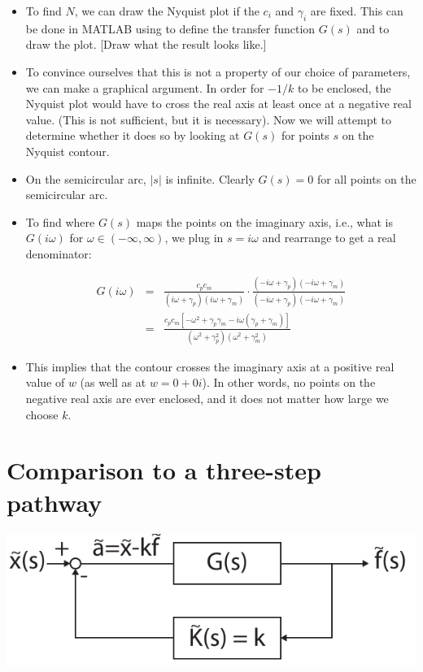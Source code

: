 \documentclass{article}
\begin{document}
\begin{itemize}
\item To find $N$, we can draw the Nyquist plot if the $c_i$ and $\gamma_i$ are fixed.  This can be done in MATLAB using  to define the transfer function $G(s)$ and  to draw the plot. [Draw what the result looks like.]

\item To convince ourselves that this is not a property of our choice of parameters, we can make a graphical argument. In order for $-1/k$ to be enclosed, the Nyquist plot would have to cross the real axis at least once at a negative real value. (This is not sufficient, but it is necessary). Now we will attempt to determine whether it does so by looking at $G(s)$ for points $s$ on the Nyquist contour.

\item On the semicircular arc, $|s|$ is infinite. Clearly $G(s)=0$ for all points on the semicircular arc.

\item To find where $G(s)$ maps the points on the imaginary axis, i.e., what is $G(i\omega)$ for $\omega \in (-\infty, \infty)$, we plug in $s=i\omega$ and rearrange to get a real denominator:

\begin{eqnarray*}
G(i \omega) & = &  \frac{c_p c_m}{\left( i\omega + \gamma_p \right)\left( i\omega + \gamma_m \right)} \cdot \frac{\left(- i\omega + \gamma_p \right)\left( - i\omega + \gamma_m \right)}{\left(- i\omega + \gamma_p \right)\left(- i\omega + \gamma_m \right)}\\
& = & \frac{c_p c_m \left[  - \omega^2 + \gamma_p \gamma_m -i \omega \left(\gamma_p + \gamma_m \right) \right]}{\left( \omega^2 + \gamma_p^2 \right)\left( \omega^2 + \gamma_m^2 \right)}
\end{eqnarray*}

\item This implies that the contour crosses the imaginary axis at a positive real value of $w$ (as well as at $w=0+0i$). In other words, no points on the negative real axis are ever enclosed, and it does not matter how large we choose $k$.
\end{itemize}


\section*{Comparison to a three-step pathway}

\begin{center}\includegraphics[width=0.5 \textwidth]{autorepression_threestep.pdf}\end{center}
\end{document}
